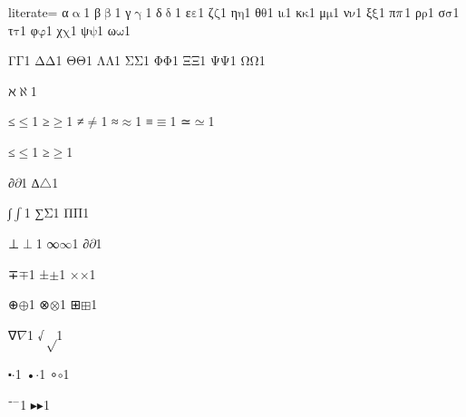 {%
literate=
{α}{{\ensuremath{\mathrm{\upalpha}}}}1
{β}{{\ensuremath{\mathrm{\upbeta}}}}1
{γ}{{\ensuremath{\mathrm{\upgamma}}}}1
{δ}{{\ensuremath{\mathrm{\updelta}}}}1
{ε}{{\ensuremath{\mathrm{\varepsilon}}}}1
{ζ}{{\ensuremath{\mathrm{\zeta}}}}1
{η}{{\ensuremath{\mathrm{\eta}}}}1
{θ}{{\ensuremath{\mathrm{\theta}}}}1
{ι}{{\ensuremath{\mathrm{\iota}}}}1
{κ}{{\ensuremath{\mathrm{\kappa}}}}1
{μ}{{\ensuremath{\mathrm{\mu}}}}1
{ν}{{\ensuremath{\mathrm{\nu}}}}1
{ξ}{{\ensuremath{\mathrm{\xi}}}}1
{π}{{\ensuremath{\mathrm{\mathnormal{\pi}}}}}1
{ρ}{{\ensuremath{\mathrm{\rho}}}}1
{σ}{{\ensuremath{\mathrm{\sigma}}}}1
{τ}{{\ensuremath{\mathrm{\tau}}}}1
{φ}{{\ensuremath{\mathrm{\varphi}}}}1
{χ}{{\ensuremath{\mathrm{\chi}}}}1
{ψ}{{\ensuremath{\mathrm{\psi}}}}1
{ω}{{\ensuremath{\mathrm{\omega}}}}1

{Γ}{{\ensuremath{\mathrm{\Gamma}}}}1
{Δ}{{\ensuremath{\mathrm{\Delta}}}}1
{Θ}{{\ensuremath{\mathrm{\Theta}}}}1
{Λ}{{\ensuremath{\mathrm{\Lambda}}}}1
{Σ}{{\ensuremath{\mathrm{\Sigma}}}}1
{Φ}{{\ensuremath{\mathrm{\Phi}}}}1
{Ξ}{{\ensuremath{\mathrm{\Xi}}}}1
{Ψ}{{\ensuremath{\mathrm{\Psi}}}}1
{Ω}{{\ensuremath{\mathrm{\Omega}}}}1

{ℵ}{{\ensuremath{\aleph}}}1

{≤}{{\ensuremath{\leq}}}1
{≥}{{\ensuremath{\geq}}}1
{≠}{{\ensuremath{\neq}}}1
{≈}{{\ensuremath{\approx}}}1
{≡}{{\ensuremath{\equiv}}}1
{≃}{{\ensuremath{\simeq}}}1

{≤}{{\ensuremath{\leq}}}1
{≥}{{\ensuremath{\geq}}}1

{∂}{{\ensuremath{\partial}}}1
{∆}{{\ensuremath{\triangle}}}1 %

{∫}{{\ensuremath{\int}}}1
{∑}{{\ensuremath{\mathrm{\Sigma}}}}1
{Π}{{\ensuremath{\mathrm{\Pi}}}}1

{⊥}{{\ensuremath{\perp}}}1
{∞}{{\ensuremath{\infty}}}1
{∂}{{\ensuremath{\partial}}}1

{∓}{{\ensuremath{\mp}}}1
{±}{{\ensuremath{\pm}}}1
{×}{{\ensuremath{\times}}}1

{⊕}{{\ensuremath{\oplus}}}1
{⊗}{{\ensuremath{\otimes}}}1
{⊞}{{\ensuremath{\boxplus}}}1

{∇}{{\ensuremath{\nabla}}}1
{√}{{\ensuremath{\sqrt}}}1

{⬝}{{\ensuremath{\cdot}}}1
{•}{{\ensuremath{\cdot}}}1
{∘}{{\ensuremath{\circ}}}1

{⁻}{{\ensuremath{^{-}}}}1
{▸}{{\ensuremath{\blacktriangleright}}}1

}
